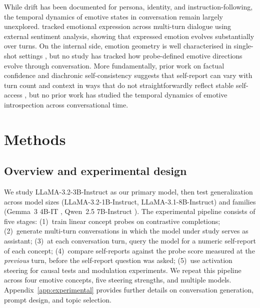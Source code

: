 \documentclass[10pt]{article}
\begin{document}
While drift has been documented for persona, identity, and instruction-following, the temporal dynamics of emotive states in conversation remain largely unexplored. \citet{Fazzi2025} tracked emotional expression across multi-turn dialogue using external sentiment analysis, showing that expressed emotion evolves substantially over turns. On the internal side, emotion geometry is well characterised in single-shot settings \citep{ZhangZhong2025, WangEmotion2025}, but no study has tracked how probe-defined emotive directions evolve through conversation. More fundamentally, prior work on factual confidence and diachronic self-consistency suggests that self-report can vary with turn count and context in ways that do not straightforwardly reflect stable self-access \citep{ZhangMultiturn2026, Prestes2025}, but no prior work has studied the temporal dynamics of emotive introspection across conversational time.

\section{Methods}
\label{sec:methods}

\subsection{Overview and experimental design}
\label{sec:methods-overview}

We study LLaMA-3.2-3B-Instruct \citep{Dubey2024} as our primary model, then test generalization across model sizes (LLaMA-3.2-1B-Instruct, LLaMA-3.1-8B-Instruct) and families (Gemma~3 4B-IT \citep{Gemma32025}, Qwen~2.5 7B-Instruct \citep{Qwen252024}).
The experimental pipeline consists of five stages: (1)~train linear concept probes on contrastive completions; (2)~generate multi-turn conversations in which the model under study serves as assistant; (3)~at each conversation turn, query the model for a numeric self-report of each concept; (4)~compare self-reports against the probe score measured at the \emph{previous} turn, before the self-report question was asked; (5)~use activation steering for causal tests and modulation experiments.
We repeat this pipeline across four emotive concepts, five steering strengths, and multiple models.
Appendix~\ref{app:experimental} provides further details on conversation generation, prompt design, and topic selection.
\end{document}
